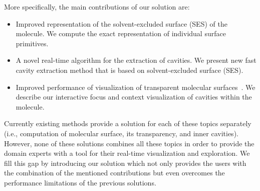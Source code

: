 More specifically, the main contributions of our solution are:
\begin{itemize}
  \item  Improved representation of the solvent-excluded surface (SES) of the molecule. We compute the exact representation of individual surface primitives.
  \item A novel real-time algorithm for the extraction of cavities. We present new fast cavity extraction method that is based on solvent-excluded surface (SES).
  \item Improved performance of visualization of transparent molecular surfaces~\cite{kauker2013rendering}. We describe our interactive focus and context visualization of cavities within the molecule.
  
\end{itemize}

Currently existing methods provide a solution for each of these topics separately (i.e., computation of molecular surface, its transparency, and inner cavities).
However, none of these solutions combines all these topics in order to provide the domain experts with a tool for their real-time visualization and exploration.
We fill this gap by introducing our solution which not only provides the users with the combination of the mentioned contributions but even overcomes the performance limitations of the previous solutions.



